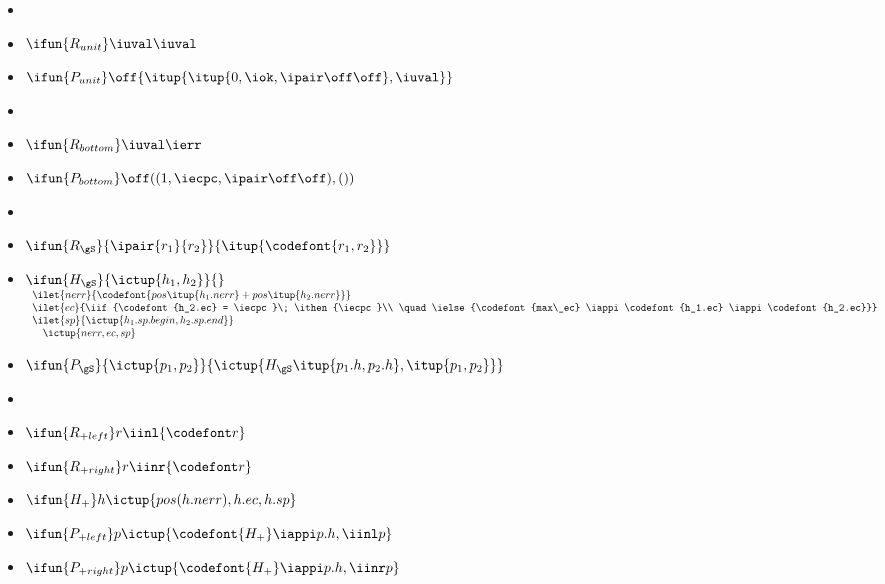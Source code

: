 {\small
\begin{itemize}
\newcommand{\labelitemi}{}

\item %
\item $\ifun {R_{unit}} \iuval \iuval$
\item $\ifun {P_{unit}} \off {\itup{\itup{0,\iok,\ipair \off \off},\iuval}}$

\item %
\item $\ifun {R_{bottom}} \iuval \ierr$
\item $\ifun {P_{bottom}} \off ((1,\iecpc,\ipair \off \off),())$

\item %
\item $\ifun {R_{\gS}} {\ipair {r_1} {r_2}} {\itup {\codefont{r_1,r_2}}}$
\item $\ifun{H_{\gS}} {\ictup{h_1,h_2}}{}$ \\
  $\begin{array}{l}
    \ilet {nerr} {\codefont{pos \itup{{h_1}.{nerr}} + pos \itup{{h_2}.{nerr}}}}\\
    \ilet {ec} {\iif {\codefont{h_2.ec} = \iecpc}\; \ithen {\iecpc}\\
    \quad \ielse {\codefont{max\_ec} \iappi \codefont{h_1.ec} \iappi \codefont{h_2.ec}}} \\
    \ilet {sp} {\ictup{h_1.sp.begin, h_2.sp.end}} \\
    \quad \ictup {nerr,ec,sp}
  \end{array}$

\item $\ifun {P_{\gS}} {\ictup{p_1, p_2}} {\ictup {H_{\gS} \itup{p_1.h,p_2.h},\itup{p_1,p_2}}}$

\item %
\item $\ifun {R_{+left}} r {\iinl {\codefont r}}$
\item $\ifun {R_{+right}} r {\iinr {\codefont r}}$

\item $\ifun {H_+} h {\ictup{pos(h.nerr),h.ec,h.sp}}$
\item $\ifun {P_{+left}} p {\ictup{\codefont{H_+} \iappi p.h, \iinl p}}$
\item $\ifun {P_{+right}} p {\ictup{\codefont{H_+} \iappi p.h, 
      \iinr  p}}$


\end{itemize}}
